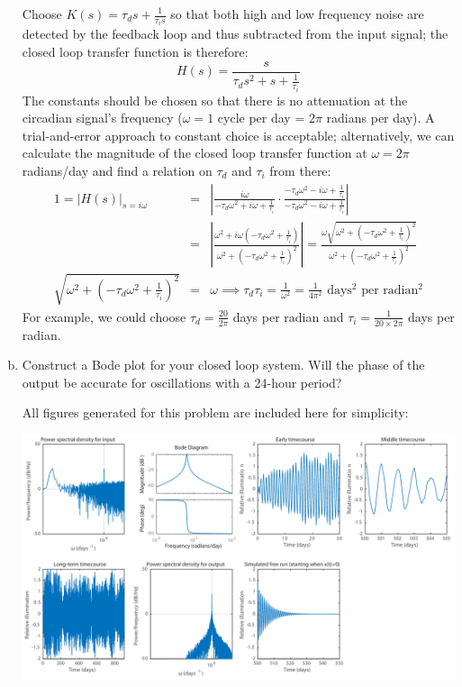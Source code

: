 \documentclass{article}
\begin{document}
\begin{enumerate}[a)]
{\color{red}
Choose $K(s) = \tau_d s + \frac{1}{\tau_i s}$ so that both high and low frequency noise are detected by the feedback loop and thus subtracted from the input signal; the closed loop transfer function is therefore:
\[ H(s) = \frac{s}{\tau_d s^2 + s + \frac{1}{\tau_i}} \]
The constants should be chosen so that there is no attenuation at the circadian signal's frequency ($\omega=1$ cycle per day = $2\pi$ radians per day). A trial-and-error approach to constant choice is acceptable; alternatively, we can calculate the magnitude of the closed loop transfer function at $\omega = 2\pi$ radians/day and find a relation on $\tau_d$ and $\tau_i$ from there:
\begin{eqnarray*}
1 = \left| H(s) \right|_{s=i\omega} & = &\left| \frac{i\omega}{-\tau_d \omega^2 + i \omega + \frac{1}{\tau_i}} \cdot \frac{-\tau_d \omega^2 - i \omega + \frac{1}{\tau_i}}{-\tau_d \omega^2 - i \omega + \frac{1}{\tau_i}} \right|\\
& = &  \left| \frac{\omega^2 + i\omega \left( -\tau_d \omega^2 + \frac{1}{\tau_i}\right)}{\omega^2 + \left( -\tau_d \omega^2 + \frac{1}{\tau_i}\right)^2} \right| = \frac{\omega \sqrt{\omega^2 + \left( -\tau_d \omega^2 + \frac{1}{\tau_i}\right)^2}}{\omega^2 + \left( -\tau_d \omega^2 + \frac{1}{\tau_i}\right)^2}\\
\sqrt{\omega^2 + \left( -\tau_d \omega^2 + \frac{1}{\tau_i}\right)^2} & = & \omega \implies \tau_d \tau_i = \frac{1}{\omega^2} = \frac{1}{4\pi^2} \textrm{ days$^2$ per radian$^2$}
\end{eqnarray*}
For example, we could choose $\tau_d = \frac{20}{2 \pi}$ days per radian and $\tau_i = \frac{1}{20 \times 2\pi}$ days per radian.
}

\item Construct a Bode plot for your closed loop system. Will the phase of the output be accurate for oscillations with a 24-hour period?\\

{\color{red}

All figures generated for this problem are included here for simplicity:

\begin{center}
\includegraphics[width=\textwidth]{problem1figs.pdf}
\end{center}

}
\end{enumerate}
\end{document}
